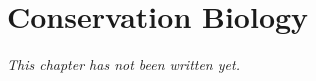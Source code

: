 \chapter{Conservation Biology}\label{ch:b2:conservation}


\emph{This chapter has not been written yet.}
